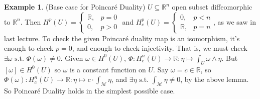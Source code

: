 \documentclass[10pt]{article}
\theoremstyle{plain}
\theoremstyle{definition}
\newtheorem{exmp}[thm]{Example} %
\newcommand{\st}{\text{ s.t. }}
\newcommand{\Real}{\mathbb{R}}
\newcommand{\man}{\mathcal{M}}
\newcommand{\cohom}[2]{H^{#1}(#2)}
\begin{document}
\begin{exmp}(Base case for Poincar\'e Duality)
$U \subseteq \Real^n$ open subset diffeomorphic to $\Real ^n$. Then $\cohom{p}{U} = \begin{cases} \Real,& p= 0\\ 0,& p > 0\end{cases}$ and $ H^p_c(U) = \begin{cases} 0,& p<n\\ \Real,& p =n\end{cases}$, as we saw in last lecture. To check the given Poincar\'e duality map is an isomorphism, it's enough to check $p = 0$, and enough to check injectivity. That is, we must check $\exists \omega \st \Phi(\omega) \neq  0.$ Given $\omega \in H^0(U)$, $\Phi: H^n_c(U) \to \Real : \eta \mapsto \int_U \omega \wedge \eta$. But $[\omega] \in H^0(U)$ so $\omega$ is a constant function on $U$. Say $\omega = c \in \Real$, so $\Phi(\omega) : H^n_c(U) \to \Real : \eta \mapsto c\cdot \int_\man \eta$, and $\exists \eta \st \int_\man \eta \neq 0$, by the above lemma. So Poincar\'e Duality holds in the simplest possible case.
\end{exmp}
\end{document}
